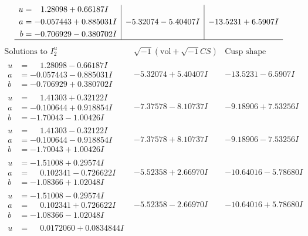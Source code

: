 \documentclass[1p]{elsarticle_modified}
\theoremstyle{definition}
\newcommand{\I}{\sqrt{-1}}
\begin{document}
$$\begin{array}{c|c|c}
\begin{aligned}
u &= \phantom{-}1.28098 + 0.66187 I \\
a &= -0.057443 + 0.885031 I \\
b &= -0.706929 - 0.380702 I\end{aligned}
 & -5.32074 - 5.40407 I & -13.5231 + 6.5907 I\\
 \hline 
 \end{array}$$\newpage$$\begin{array}{c|c|c}  
\text{Solutions to }I^u_{2}& \I (\text{vol} + \sqrt{-1}CS) & \text{Cusp shape}\\
 \hline 
\begin{aligned}
u &= \phantom{-}1.28098 - 0.66187 I \\
a &= -0.057443 - 0.885031 I \\
b &= -0.706929 + 0.380702 I\end{aligned}
 & -5.32074 + 5.40407 I & -13.5231 - 6.5907 I \\ \hline\begin{aligned}
u &= \phantom{-}1.41303 + 0.32122 I \\
a &= -0.100644 + 0.918854 I \\
b &= -1.70043 - 1.00426 I\end{aligned}
 & -7.37578 - 8.10737 I & -9.18906 + 7.53256 I \\ \hline\begin{aligned}
u &= \phantom{-}1.41303 - 0.32122 I \\
a &= -0.100644 - 0.918854 I \\
b &= -1.70043 + 1.00426 I\end{aligned}
 & -7.37578 + 8.10737 I & -9.18906 - 7.53256 I \\ \hline\begin{aligned}
u &= -1.51008 + 0.29574 I \\
a &= \phantom{-}0.102341 - 0.726622 I \\
b &= -1.08366 + 1.02048 I\end{aligned}
 & -5.52358 + 2.66970 I & -10.64016 - 5.78680 I \\ \hline\begin{aligned}
u &= -1.51008 - 0.29574 I \\
a &= \phantom{-}0.102341 + 0.726622 I \\
b &= -1.08366 - 1.02048 I\end{aligned}
 & -5.52358 - 2.66970 I & -10.64016 + 5.78680 I \\ \hline\begin{aligned}
u &= \phantom{-}0.0172060 + 0.0834844 I \\

\end{aligned}
\end{array}$$
\end{document}
